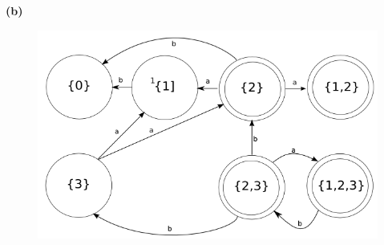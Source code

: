 \documentclass[11pt]{article}
\renewcommand{\part}[1] {\vspace{.10in} {\bf (#1)}}
\begin{document}
\part{b}
\begin{figure}[h!]
  \begin{center}
    \includegraphics[scale=0.40]{16b.png}
  \end{center}
\end{figure}
\end{document}
